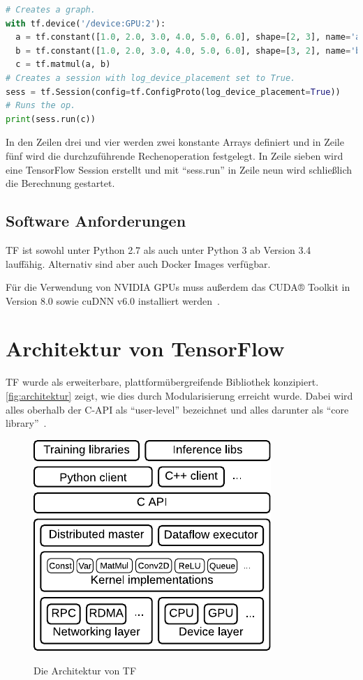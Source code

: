 \begin{minipage}{\linewidth}
\begin{lstlisting}[language=Python, label=lst:tf-dev, caption={Festlegung des Geräts, auf dem die Berechnung getätigt werden soll}]
# Creates a graph.
with tf.device('/device:GPU:2'):
  a = tf.constant([1.0, 2.0, 3.0, 4.0, 5.0, 6.0], shape=[2, 3], name='a')
  b = tf.constant([1.0, 2.0, 3.0, 4.0, 5.0, 6.0], shape=[3, 2], name='b')
  c = tf.matmul(a, b)
# Creates a session with log_device_placement set to True.
sess = tf.Session(config=tf.ConfigProto(log_device_placement=True))
# Runs the op.
print(sess.run(c))
\end{lstlisting}
\end{minipage}
\vspace{0.2cm}

In den Zeilen drei und vier werden zwei konstante Arrays definiert und in Zeile fünf wird die durchzuführende Rechenoperation festgelegt. In Zeile sieben wird eine TensorFlow Session erstellt und mit "`sess.run"' in Zeile neun wird schließlich die Berechnung gestartet.

\subsection{Software Anforderungen}
\Gls{TF} ist sowohl unter Python 2.7 als auch unter Python 3 ab Version 3.4~\cite{tfinstall} lauffähig. Alternativ sind aber auch Docker Images verfügbar.

Für die Verwendung von NVIDIA GPUs muss außerdem das CUDA® Toolkit in Version 8.0 	sowie cuDNN v6.0 installiert werden~\cite{tfinstall}.

\section{Architektur von TensorFlow}
\Gls{TF} wurde als erweiterbare, plattformübergreifende Bibliothek konzipiert. \autoref{fig:architektur} zeigt, wie dies durch Modularisierung erreicht wurde. Dabei wird alles oberhalb der C-\gls{API} als "`user-level"' bezeichnet und alles darunter als "`core library"'~\cite{tensorflow2016-whitepaper}.

\begin{figure}[htb!]
	\centering
	 \includegraphics[width=.5\textwidth]{images/architektur.pdf}\\
	\vspace{10pt} 
	\caption{Die Architektur von \gls{TF}~\cite{tensorflow2016-whitepaper}}
	\label{fig:architektur}
\end{figure}

